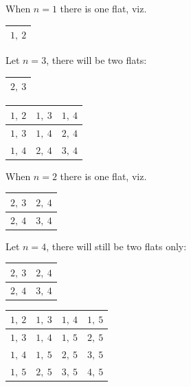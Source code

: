 \documentclass[11pt]{article}
\begin{document}
\begin{center}
\begin{minipage}{0.42\linewidth}
\centering
When $n=1$ there is one flat, viz.\par\medskip
\begin{tabular}{|c|}\hline
$1,\ 2$\\ \hline
\end{tabular}\par\medskip
Let $n=3$, there will be two flats:\par\medskip
\begin{tabular}{|c|}\hline
$2,\ 3$\\ \hline
\end{tabular}\par\medskip
\begin{tabular}{|c|c|c|}\hline
$1,\ 2$&$1,\ 3$&$1,\ 4$\\ \hline
$1,\ 3$&$1,\ 4$&$2,\ 4$\\ \hline
$1,\ 4$&$2,\ 4$&$3,\ 4$\\ \hline
\end{tabular}
\end{minipage}\hfill
\begin{minipage}{0.5\linewidth}
\centering
When $n=2$ there is one flat, viz.\par\medskip
\begin{tabular}{|c|c|}\hline
$2,\ 3$&$2,\ 4$\\ \hline
$2,\ 4$&$3,\ 4$\\ \hline
\end{tabular}\par\medskip
Let $n=4$, there will still be two flats only:\par\medskip
\begin{tabular}{|c|c|}\hline
$2,\ 3$&$2,\ 4$\\ \hline
$2,\ 4$&$3,\ 4$\\ \hline
\end{tabular}\par\medskip
\scriptsize
\begin{tabular}{|c|c|c|c|}\hline
$1,\ 2$&$1,\ 3$&$1,\ 4$&$1,\ 5$\\ \hline
$1,\ 3$&$1,\ 4$&$1,\ 5$&$2,\ 5$\\ \hline
$1,\ 4$&$1,\ 5$&$2,\ 5$&$3,\ 5$\\ \hline
$1,\ 5$&$2,\ 5$&$3,\ 5$&$4,\ 5$\\ \hline
\end{tabular}
\end{minipage}
\end{center}
\end{document}
